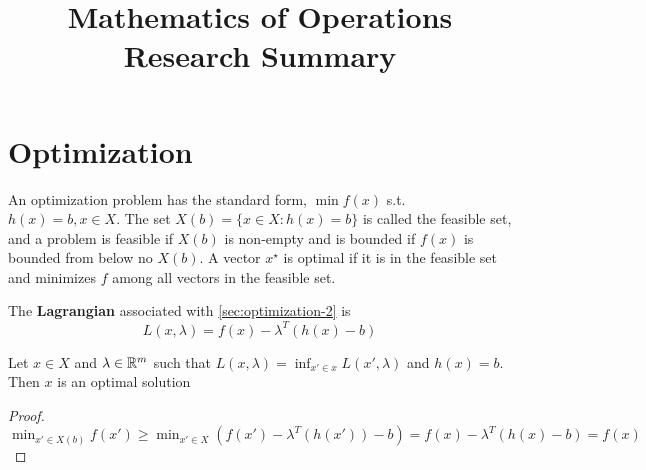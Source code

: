 

\title{Mathematics of Operations Research Summary}



\maketitle

\section{Optimization}
\label{sec:optimization}

\begin{defn}
  \label{sec:optimization-2}
  An optimization problem has the standard form, $\min f(x)$ s.t.
  $h(x) = b, x \in X$.  The set $X(b) = \{ x \in X : h(x) = b \} $ is
  called the feasible set, and a problem is feasible if $X(b)$ is
  non-empty and is bounded if $f(x)$ is bounded from below no $X(b)$.
  A vector $ x^{\star}$ is optimal if it is in the feasible set and
  minimizes $f$ among all vectors in the feasible set.
\end{defn}

\begin{defn}
  \label{sec:optimization-3}
  The \textbf{Lagrangian} associated with \ref{sec:optimization-2} is
  \begin{equation}
    \label{eq:1}
    L(x, \lambda) = f(x) - \lambda^{T} (h(x) - b)
  \end{equation}

\end{defn}

\begin{thm}
  \label{sec:optimization-1}
  Let $x \in X$ and $\lambda \in \mathbb{R}^{m}$ such that $L(x, \lambda) =
  \inf_{x' \in x} L(x', \lambda)$ and $h(x) = b$.  Then $x$ is an
  optimal solution
\end{thm}

\begin{proof}
  $\min_{x' \in X(b)} f(x') \geq \min_{x' \in X} (f(x') -
  \lambda^{T}(h(x')) - b) = f(x) - \lambda^{T}(h(x) - b) = f(x)$
\end{proof}

